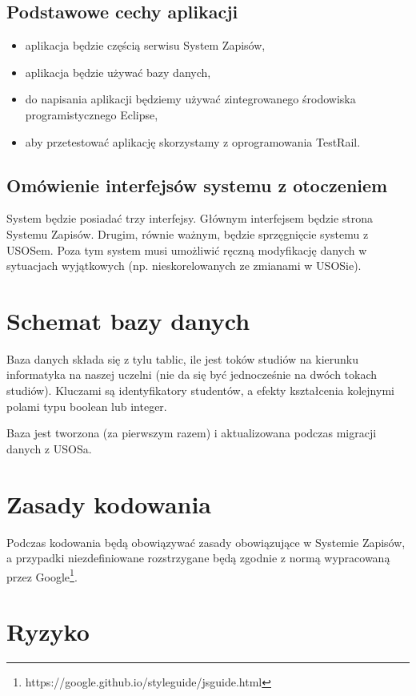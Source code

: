 \documentclass{article}
\begin{document}
\subsection{Podstawowe cechy aplikacji}
\begin{itemize}
 \item aplikacja będzie częścią serwisu System Zapisów,
 \item aplikacja będzie używać bazy danych,
 \item do napisania aplikacji będziemy używać zintegrowanego środowiska programistycznego Eclipse,
 \item aby przetestować aplikację skorzystamy z oprogramowania TestRail.
\end{itemize}

\subsection{Omówienie interfejsów systemu z otoczeniem}
System będzie posiadać trzy interfejsy.
Głównym interfejsem będzie strona Systemu Zapisów.
Drugim, równie ważnym, będzie sprzęgnięcie systemu z USOSem.
Poza tym system musi umożliwić ręczną modyfikację danych w sytuacjach wyjątkowych (np. nieskorelowanych ze zmianami w USOSie).


\section{Schemat bazy danych}
Baza danych składa się z tylu tablic, ile jest toków studiów na kierunku informatyka na naszej uczelni (nie da się być jednocześnie na dwóch tokach studiów).
Kluczami są identyfikatory studentów, a efekty kształcenia kolejnymi polami typu boolean lub integer.

Baza jest tworzona (za pierwszym razem) i aktualizowana podczas migracji danych z USOSa.


\afterpage{\null\newpage}
\newpage


\section{Zasady kodowania}
Podczas kodowania będą obowiązywać zasady obowiązujące w Systemie Zapisów, a przypadki niezdefiniowane rozstrzygane będą zgodnie z normą wypracowaną przez Google\footnote{https://google.github.io/styleguide/jsguide.html}.


\section{Ryzyko}
\end{document}
